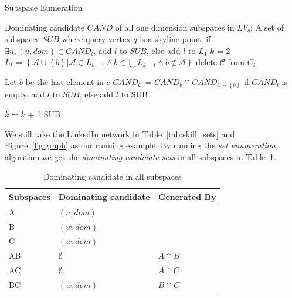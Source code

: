 \begin{algorithm}[H]
  \caption{Subspace Eumeration}\label{algo:blah}
    \begin{algorithmic}[1]
  \show\LOOP
    \REQUIRE Dominating candidate $\mathit{CAND}$ of all one dimension subspaces in $LV_q$;
    \ENSURE A set of subspaces $SUB$ where query vertex $q$ is a skyline point;
            \STATE if $\exists u, (u, dom)\in \mathit{CAND}_l$, add $l$ to $SUB$, else add $l$ to $L_1$
        \ENDFOR
        \STATE $k$ = 2
            \STATE $L_k = \left\{\mathcal{A} \cup \left\{b\right\} | \mathcal{A} \in L_{k-1} \wedge b \in \bigcup L_{k-1} \wedge b \notin \mathcal{A} \right\}$
                        \STATE delete $\mathcal{C}$ from $C_k$
                    \ENDIF
                \ENDFOR
            \ENDFOR
            
                \STATE Let $b$ be the last element in $c$
                \STATE $CAND_\mathcal{C}$ = $CAND_b \cap CAND_{\mathcal{C}-\left\{b\right\}}$
                \STATE if $CAND_l$ is empty, add $l$ to $SUB$, else add $l$ to SUB
            \ENDFOR
            
            \STATE $k$ = $k$ + 1
        \ENDWHILE
        \RETURN SUB
  \end{algorithmic}
\end{algorithm}

We still take the LinkedIn network in Table~\ref{tab:skill_sets} and Figure~\ref{fig:graph} as our running example. By running the \emph{set enumeration} algorithm we get the \emph{dominating candidate sets} in all subspaces in Table~\ref{tab:sub_dom_cand_pruned}.

\begin{table}[H]
    \centering
    \begin{tabular}{|l|l|l|}
    \hline
    Subspaces & Dominating candidate & Generated By \\ \hline
    A         & $(u, dom)$  &              \\ \hline
    B         & $(w, dom)$  &              \\ \hline
    C         & $(w, dom)$  &              \\ \hline
    AB        & $\emptyset$           & $A \cap B$   \\ \hline
    AC        & $\emptyset$           & $A \cap C$   \\ \hline
    BC        & $(w, dom)$            & $B \cap C$   \\ \hline
    \end{tabular}
    \caption{Dominating candidate in all subspaces}
    \label{tab:sub_dom_cand_pruned}
\end{table}

